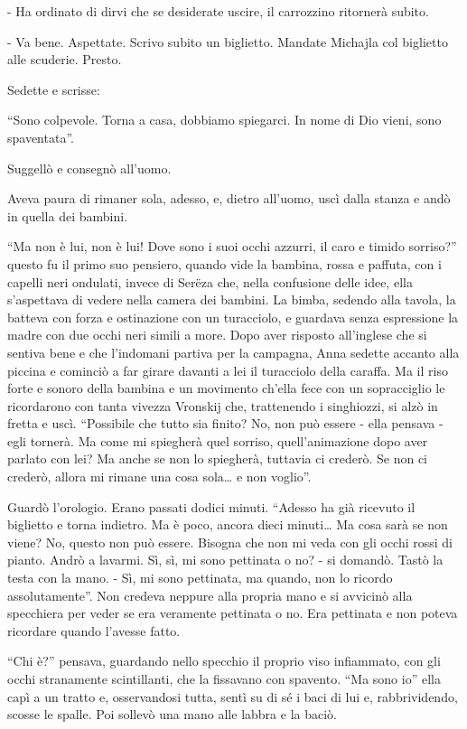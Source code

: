 - Ha ordinato di dirvi che se desiderate uscire, il carrozzino ritornerà subito. 

- Va bene. Aspettate. Scrivo subito un biglietto. Mandate Michajla col biglietto alle scuderie. Presto. 

Sedette e scrisse: 

``Sono colpevole. Torna a casa, dobbiamo spiegarci. In nome di Dio vieni, sono spaventata''. 

Suggellò e consegnò all'uomo. 
\enlargethispage{\baselineskip}

Aveva paura di rimaner sola, adesso, e, dietro all'uomo, uscì dalla stanza e andò in quella dei bambini. 

``Ma non è lui, non è lui! Dove sono i suoi occhi azzurri, il caro e timido sorriso?'' questo fu il primo suo pensiero, quando vide la bambina, rossa e paffuta, con i capelli neri ondulati, invece di Serëza che, nella confusione delle idee, ella s'aspettava di vedere nella camera dei bambini. La bimba, sedendo alla tavola, la batteva con forza e ostinazione con un turacciolo, e guardava senza espressione la madre con due occhi neri simili a more. Dopo aver risposto all'inglese che si sentiva bene e che l'indomani partiva per la campagna, Anna sedette accanto alla piccina e cominciò a far girare davanti a lei il turacciolo della caraffa. Ma il riso forte e sonoro della bambina e un movimento ch'ella fece con un sopracciglio le ricordarono con tanta vivezza Vronskij che, trattenendo i singhiozzi, si alzò in fretta e uscì. ``Possibile che tutto sia finito? No, non può essere - ella pensava - egli tornerà. Ma come mi spiegherà quel sorriso, quell'animazione dopo aver parlato con lei? Ma anche se non lo spiegherà, tuttavia ci crederò. Se non ci crederò, allora mi rimane una cosa sola\ldots{} e non voglio''. 

Guardò l'orologio. Erano passati dodici minuti. ``Adesso ha già ricevuto il biglietto e torna indietro. Ma è poco, ancora dieci minuti\ldots{} Ma cosa sarà se non viene? No, questo non può essere. Bisogna che non mi veda con gli occhi rossi di pianto. Andrò a lavarmi. Sì, sì, mi sono pettinata o no? - si domandò. Tastò la testa con la mano. - Sì, mi sono pettinata, ma quando, non lo ricordo assolutamente''. Non credeva neppure alla propria mano e si avvicinò alla specchiera per veder se era veramente pettinata o no. Era pettinata e non poteva ricordare quando l'avesse fatto. 

``Chi è?'' pensava, guardando nello specchio il proprio viso infiammato, con gli occhi stranamente scintillanti, che la fissavano con spavento. ``Ma sono io'' ella capì a un tratto e, osservandosi tutta, sentì su di sé i baci di lui e, rabbrividendo, scosse le spalle. Poi sollevò una mano alle labbra e la baciò. 

